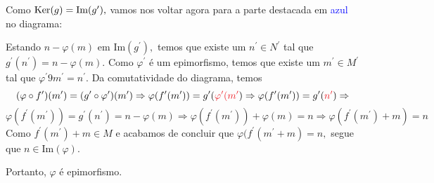 \documentclass[11pt,a4paper]{article}
\begin{document}
Como ${\rm Ker}(g) = \mbox{Im}(g^{\prime}),$ vamos nos voltar agora para a parte destacada em \textcolor{Blue}{azul} no diagrama:

\begin{center}
\end{center}

Estando $n - \varphi(m)$ em $\mbox{Im}(g^{\prime}),$ temos que existe um $n^{\prime} \in N^{\prime}$ tal que $g^{\prime}(n^{\prime}) = n - \varphi(m).$ Como $\varphi^{\prime}$ é um epimorfismo, temos que existe um $m^{\prime} \in M^{\prime}$ tal que $\varphi^{\prime}9m^{\prime} = n^{\prime}.$ Da comutatividade do diagrama, temos
\[
(\varphi \circ f^{\prime})(m^{\prime}) = (g^{\prime} \circ \varphi^{\prime})(m^{\prime}) \Rightarrow \varphi(f^{\prime}(m^{\prime})) = g^{\prime} (\textcolor{Red}{\varphi^{\prime}(m^{\prime}}) \Rightarrow \varphi(f^{\prime}(m^{\prime})) = g^{\prime} (\textcolor{Red}{n^{\prime}}) \Rightarrow \]\[
\varphi(f^{\prime}(m^{\prime})) = g^{\prime} (n^{\prime}) = n - \varphi(m) \Rightarrow \varphi(f^{\prime}(m^{\prime})) + \varphi(m) = n \Rightarrow \varphi(f^{\prime}(m^{\prime}) + m) = n
\]
Como $f^{\prime}(m^{\prime}) + m \in M$ e acabamos de concluir que $\varphi(f^{\prime}(m^{\prime} + m) = n,$ segue que $n \in \mbox{Im}(\varphi).$

Portanto, $\varphi$ é epimorfismo.
\end{document}
